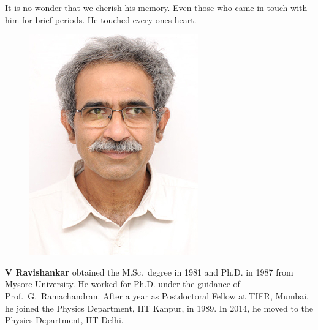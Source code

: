 It is no wonder that we cherish his memory. Even those who came in touch with him for brief periods. He touched every ones heart.
\medskip

\begin{figure}%
\vspace{-4\baselineskip}
\includegraphics[scale=.3]{authorsphotos/V_Ravishankar.jpg}
\end{figure}%
\noindent
\textbf{V Ravishankar} obtained the M.Sc.\ degree in 1981 and Ph.D. in 1987 from Mysore University. He worked for Ph.D. under the guidance of Prof.\ G.\ Ramachandran. After a year as Postdoctoral Fellow at TIFR, Mumbai, he joined the Physics Department, IIT Kanpur, in 1989. In 2014, he moved to the Physics Department, IIT Delhi.


